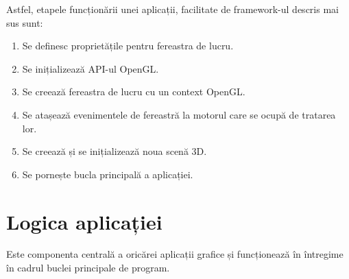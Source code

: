 \documentclass[12pt,a4paper]{report}
\begin{document}
Astfel, etapele funcționării unei aplicații, facilitate de framework-ul descris mai sus sunt:
\begin{enumerate}
	\item Se definesc proprietățile pentru fereastra de lucru.
	\item Se inițializează API-ul OpenGL.
	\item Se creează fereastra de lucru cu un context OpenGL.
	\item Se atașează evenimentele de fereastră la motorul care se ocupă de tratarea lor.
	\item Se creează și se inițializează noua scenă 3D.
	\item Se pornește bucla principală a aplicației.
\end{enumerate}

\section{Logica aplicației}

Este componenta centrală a oricărei aplicații grafice și funcționează în întregime în cadrul buclei principale de program.
\end{document}
